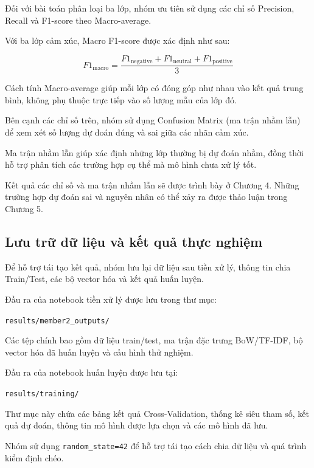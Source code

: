 Đối với bài toán phân loại ba lớp, nhóm ưu tiên sử dụng các chỉ số Precision, Recall và F1-score theo Macro-average.

Với ba lớp cảm xúc, Macro F1-score được xác định như sau:

\begin{equation}
F1_{\text{macro}}
=
\frac{
F1_{\text{negative}}
+
F1_{\text{neutral}}
+
F1_{\text{positive}}
}{3}
\end{equation}

Cách tính Macro-average giúp mỗi lớp có đóng góp như nhau vào kết quả trung bình, không phụ thuộc trực tiếp vào số lượng mẫu của lớp đó.

Bên cạnh các chỉ số trên, nhóm sử dụng Confusion Matrix (ma trận nhầm lẫn) để xem xét số lượng dự đoán đúng và sai giữa các nhãn cảm xúc.

Ma trận nhầm lẫn giúp xác định những lớp thường bị dự đoán nhầm, đồng thời hỗ trợ phân tích các trường hợp cụ thể mà mô hình chưa xử lý tốt.

Kết quả các chỉ số và ma trận nhầm lẫn sẽ được trình bày ở Chương 4. Những trường hợp dự đoán sai và nguyên nhân có thể xảy ra được thảo luận trong Chương 5.


\subsection{Lưu trữ dữ liệu và kết quả thực nghiệm}

Để hỗ trợ tái tạo kết quả, nhóm lưu lại dữ liệu sau tiền xử lý, thông tin chia Train/Test, các bộ vector hóa và kết quả huấn luyện.

Đầu ra của notebook tiền xử lý được lưu trong thư mục:

\begin{center}
\texttt{results/member2\_outputs/}
\end{center}

Các tệp chính bao gồm dữ liệu train/test, ma trận đặc trưng BoW/TF-IDF, bộ vector hóa đã huấn luyện và cấu hình thử nghiệm.

Đầu ra của notebook huấn luyện được lưu tại:

\begin{center}
\texttt{results/training/}
\end{center}

Thư mục này chứa các bảng kết quả Cross-Validation, thống kê siêu tham số, kết quả dự đoán, thông tin mô hình được lựa chọn và các mô hình đã lưu.

Nhóm sử dụng \texttt{random\_state=42} để hỗ trợ tái tạo cách chia dữ liệu và quá trình kiểm định chéo.

